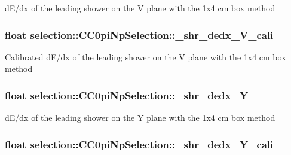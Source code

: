 d\-E/dx of the leading shower on the V plane with the 1x4 cm box method \hypertarget{classselection_1_1CC0piNpSelection_a0ef852fb0ecd8a3b6f871ed765be12da}{
\subsubsection[{\-\_\-shr\-\_\-dedx\-\_\-\-V\-\_\-cali}]{\setlength{\rightskip}{0pt plus 5cm}float selection\-::\-C\-C0pi\-Np\-Selection\-::\-\_\-shr\-\_\-dedx\-\_\-\-V\-\_\-cali\hspace{0.3cm}{\ttfamily [private]}}}\label{classselection_1_1CC0piNpSelection_a0ef852fb0ecd8a3b6f871ed765be12da}
Calibrated d\-E/dx of the leading shower on the V plane with the 1x4 cm box method \hypertarget{classselection_1_1CC0piNpSelection_a1af96c31bd3afe4b111f429927bbff1c}{
\subsubsection[{\-\_\-shr\-\_\-dedx\-\_\-\-Y}]{\setlength{\rightskip}{0pt plus 5cm}float selection\-::\-C\-C0pi\-Np\-Selection\-::\-\_\-shr\-\_\-dedx\-\_\-\-Y\hspace{0.3cm}{\ttfamily [private]}}}\label{classselection_1_1CC0piNpSelection_a1af96c31bd3afe4b111f429927bbff1c}
d\-E/dx of the leading shower on the Y plane with the 1x4 cm box method \hypertarget{classselection_1_1CC0piNpSelection_a114f4276a8931d33d8f77fede58398fa}{
\subsubsection[{\-\_\-shr\-\_\-dedx\-\_\-\-Y\-\_\-cali}]{\setlength{\rightskip}{0pt plus 5cm}float selection\-::\-C\-C0pi\-Np\-Selection\-::\-\_\-shr\-\_\-dedx\-\_\-\-Y\-\_\-cali\hspace{0.3cm}{\ttfamily [private]}}}\label{classselection_1_1CC0piNpSelection_a114f4276a8931d33d8f77fede58398fa}
